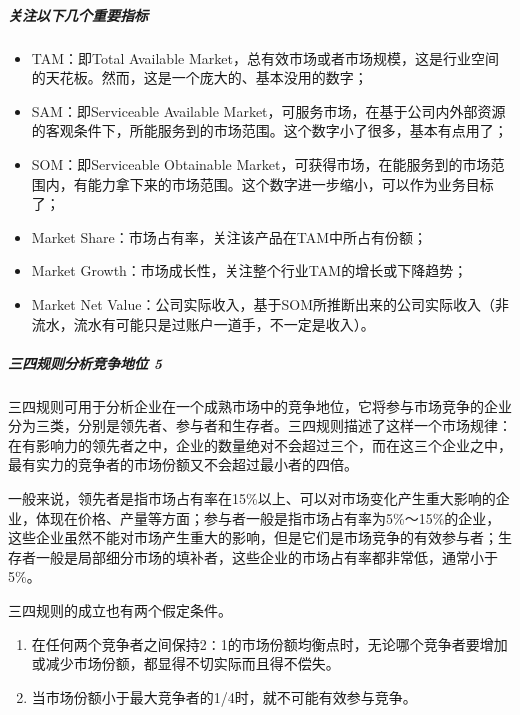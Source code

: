 \documentclass[letterpaper,11pt,english]{sphinxmanual}
\begin{document}
\subparagraph{关注以下几个重要指标}
\label{\detokenize{chapter_knowledge/industry_analysis:id15}}\begin{itemize}
\item {} 
TAM：即Total Available
Market，总有效市场或者市场规模，这是行业空间的天花板。然而，这是一个庞大的、基本没用的数字；

\item {} 
SAM：即Serviceable Available
Market，可服务市场，在基于公司内外部资源的客观条件下，所能服务到的市场范围。这个数字小了很多，基本有点用了；

\item {} 
SOM：即Serviceable Obtainable
Market，可获得市场，在能服务到的市场范围内，有能力拿下来的市场范围。这个数字进一步缩小，可以作为业务目标了；

\item {} 
Market Share：市场占有率，关注该产品在TAM中所占有份额；

\item {} 
Market Growth：市场成长性，关注整个行业TAM的增长或下降趋势；

\item {} 
Market Net
Value：公司实际收入，基于SOM所推断出来的公司实际收入（非流水，流水有可能只是过账户一道手，不一定是收入）。

\end{itemize}


\subparagraph{三四规则分析竞争地位 5\sphinxfootnotemark[435]}
\label{\detokenize{chapter_knowledge/industry_analysis:id16}}%
\begin{footnotetext}[435]\sphinxAtStartFootnote
{}
%
\end{footnotetext}\ignorespaces 
三四规则可用于分析企业在一个成熟市场中的竞争地位，它将参与市场竞争的企业分为三类，分别是领先者、参与者和生存者。三四规则描述了这样一个市场规律：在有影响力的领先者之中，企业的数量绝对不会超过三个，而在这三个企业之中，最有实力的竞争者的市场份额又不会超过最小者的四倍。

一般来说，领先者是指市场占有率在15\%以上、可以对市场变化产生重大影响的企业，体现在价格、产量等方面；参与者一般是指市场占有率为5\%～15\%的企业，这些企业虽然不能对市场产生重大的影响，但是它们是市场竞争的有效参与者；生存者一般是局部细分市场的填补者，这些企业的市场占有率都非常低，通常小于5\%。

三四规则的成立也有两个假定条件。
\begin{enumerate}
%
\item {} 
在任何两个竞争者之间保持2∶1的市场份额均衡点时，无论哪个竞争者要增加或减少市场份额，都显得不切实际而且得不偿失。

\item {} 
当市场份额小于最大竞争者的1/4时，就不可能有效参与竞争。

\end{enumerate}
\end{document}
